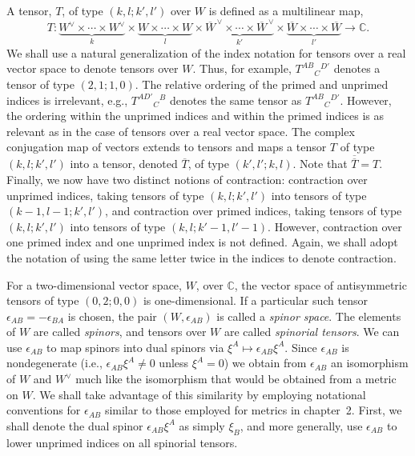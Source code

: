 A tensor, \(T\), of type \((k,l;k',l')\) over \(W\) is defined as a multilinear map,
\[
  T:\underbrace{W^\vee\times\cdots\times W^\vee}_{k}
  \times\underbrace{W\times\cdots\times W}_{l}
  \times\underbrace{\overline{W}^{\,\vee}\times\cdots\times\overline{W}^{\,\vee}}_{k'}
  \times\underbrace{\overline W\times\cdots\times\overline W}_{l'}
  \longrightarrow\mathbb C.
\]
We shall use a natural generalization of the index notation for tensors over a real
vector space to denote tensors over \(W\). Thus, for example, \(T^{AB}{}_{C}{}^{D'}\)
denotes a tensor of type \((2,1;1,0)\). The relative ordering of the primed and
unprimed indices is irrelevant, e.g., \(T^{AD'}{}_{C}{}^B\) denotes the same tensor
as \(T^{AB}{}_{C}{}^{D'}\). However, the ordering within the unprimed indices and
within the primed indices is as relevant as in the case of tensors over a real vector
space. The complex conjugation map of vectors extends to tensors and maps a tensor
\(T\) of type \((k,l;k',l')\) into a tensor, denoted \(\overline T\), of type
\((k',l';k,l)\). Note that \(\overline{\overline T}=T\). Finally, we now have two
distinct notions of contraction: contraction over unprimed indices, taking tensors of
type \((k,l;k',l')\) into tensors of type \((k-1,l-1;k',l')\), and contraction over
primed indices, taking tensors of type \((k,l;k',l')\) into tensors of type
\((k,l;k'-1,l'-1)\). However, contraction over one primed index and one unprimed
index is not defined. Again, we shall adopt the notation of using the same letter
twice in the indices to denote contraction.

For a two-dimensional vector space, \(W\), over \(\mathbb C\), the vector space of
antisymmetric tensors of type \((0,2;0,0)\) is one-dimensional. If a particular such
tensor \(\epsilon_{AB}=-\epsilon_{BA}\) is chosen, the pair
\((W,\epsilon_{AB})\) is called a \emph{spinor space}. The elements of \(W\) are
called \emph{spinors}, and tensors over \(W\) are called \emph{spinorial tensors}.
We can use \(\epsilon_{AB}\) to map spinors into dual spinors via
\(\xi^A\mapsto\epsilon_{AB}\xi^A\). Since \(\epsilon_{AB}\) is nondegenerate
(i.e., \(\epsilon_{AB}\xi^A\ne0\) unless \(\xi^A=0\)) we obtain from
\(\epsilon_{AB}\) an isomorphism of \(W\) and \(W^\vee\) much like the isomorphism that
would be obtained from a metric on \(W\). We shall take advantage of this similarity
by employing notational conventions for \(\epsilon_{AB}\) similar to those employed
for metrics in chapter~2. First, we shall denote the dual spinor
\(\epsilon_{AB}\xi^A\) as simply \(\xi_B\), and more generally, use
\(\epsilon_{AB}\) to lower unprimed indices on all spinorial tensors.

